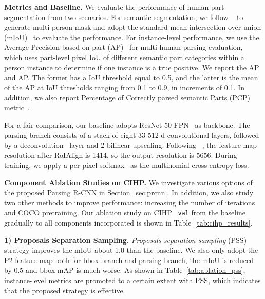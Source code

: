 \documentclass[10pt,twocolumn,letterpaper]{article}
\begin{document}
\vspace{6pt}
\noindent\textbf{Metrics and Baseline.} We evaluate the performance of human part segmentation from two scenarios. For semantic segmentation, we follow ~\cite{Kirillov_arxiv2018_ps} to generate multi-person mask and adopt the standard mean intersection over union (mIoU)~\cite{Long_cvpr2015_fcn} to evaluate the performance. For instance-level performance, we use the Average Precision based on part (AP)~\cite{Zhao_mm2018_mhpv2} for multi-human parsing evaluation, which uses part-level pixel IoU of different semantic part categories within a person instance to determine if one instance is a true positive. We report the AP and AP. The former has a IoU threshold equal to 0.5, and the latter is the mean of the AP at IoU thresholds ranging from 0.1 to 0.9, in increments of 0.1. In addition, we also report Percentage of Correctly parsed semantic Parts (PCP) metric~\cite{Zhao_mm2018_mhpv2}. 

For a fair comparison, our baseline adopts ResNet-50-FPN~\cite{He_cvpr2016_resnet, He_eccv2016_identity, Xie_cvpr2017_resnext, Lin_cvpr2017_fpn} as backbone. The parsing branch consists of a stack of eight 33 512-d convolutional layers, followed by a deconvolution~\cite{Zeiler_eccv2014_visualizing} layer and 2 bilinear upscaling. Following ~\cite{He_iccv2017_maskrcnn}, the feature map resolution after RoIAlign is 1414, so the output resolution is 5656.  During training, we apply a per-pixel softmax~\cite{Long_cvpr2015_fcn} as the multinomial cross-entropy loss.


\vspace{6pt}
\noindent\textbf{Component Ablation Studies on CIHP.} We investigate various options of the proposed Parsing R-CNN in Section~\ref{sec:prcnn}. In addition, we also study two other methods to improve performance: increasing the number of iterations and COCO pretraining. Our ablation study on CIHP~\cite{Gong_eccv2018_pgn} \texttt{val} from the baseline gradually to all components incorporated is shown in Table~\ref{tab:cihp_results}. 

\vspace{3pt}
\noindent\textbf{1) Proposals Separation Sampling.} \emph{Proposals separation sampling} (PSS) strategy improves the mIoU about 1.0 than the baseline. We also only adopt the P2 feature map both for bbox branch and parsing branch, the mIoU is reduced by 0.5 and bbox mAP is much worse. As shown in Table~\ref{tab:ablation_pss}, instance-level metrics are promoted to a certain extent with PSS, which indicates that the proposed strategy is effective.
\end{document}

